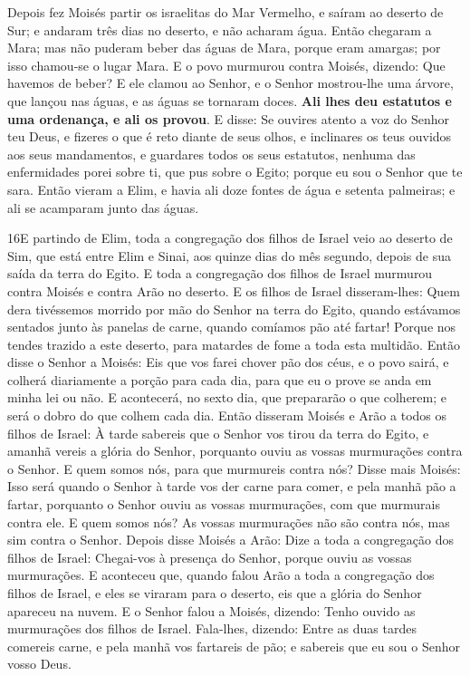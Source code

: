 Depois fez Moisés partir os israelitas do Mar Vermelho, e saíram
ao deserto de Sur; e andaram três dias no deserto, e não acharam
água. Então chegaram a Mara; mas não puderam beber das águas
de Mara, porque eram amargas; por isso chamou-se o lugar Mara.
E o povo murmurou contra Moisés, dizendo: Que havemos de
beber? E ele clamou ao Senhor, e o Senhor mostrou-lhe uma
árvore, que lançou nas águas, e as águas se tornaram doces.
\textbf{Ali lhes deu estatutos e uma ordenança, e ali os provou}.
E disse: Se ouvires atento a voz do Senhor teu Deus, e
fizeres o que é reto diante de seus olhos, e inclinares os teus
ouvidos aos seus mandamentos, e guardares todos os seus estatutos,
nenhuma das enfermidades porei sobre ti, que pus sobre o Egito;
porque eu sou o Senhor que te sara. Então vieram a Elim, e
havia ali doze fontes de água e setenta palmeiras; e ali se
acamparam junto das águas.

\medskip

\lettrine{16} E partindo de Elim, toda a congregação dos
filhos de Israel veio ao deserto de Sim, que está entre Elim e
Sinai, aos quinze dias do mês segundo, depois de sua saída da terra
do Egito. E toda a congregação dos filhos de Israel murmurou
contra Moisés e contra Arão no deserto. E os filhos de Israel
disseram-lhes: Quem dera tivéssemos morrido por mão do Senhor na
terra do Egito, quando estávamos sentados junto às panelas de carne,
quando comíamos pão até fartar! Porque nos tendes trazido a este
deserto, para matardes de fome a toda esta multidão. Então disse
o Senhor a Moisés: Eis que vos farei chover pão dos céus, e o povo
sairá, e colherá diariamente a porção para cada dia, para que eu o
prove se anda em minha lei ou não. E acontecerá, no sexto dia,
que prepararão o que colherem; e será o dobro do que colhem cada
dia. Então disseram Moisés e Arão a todos os filhos de Israel: À
tarde sabereis que o Senhor vos tirou da terra do Egito, e
amanhã vereis a glória do Senhor, porquanto ouviu as vossas
murmurações contra o Senhor. E quem somos nós, para que murmureis
contra nós? Disse mais Moisés: Isso será quando o Senhor à tarde
vos der carne para comer, e pela manhã pão a fartar, porquanto o
Senhor ouviu as vossas murmurações, com que murmurais contra ele. E
quem somos nós? As vossas murmurações não são contra nós, mas sim
contra o Senhor. Depois disse Moisés a Arão: Dize a toda a
congregação dos filhos de Israel: Chegai-vos à presença do Senhor,
porque ouviu as vossas murmurações. E aconteceu que, quando
falou Arão a toda a congregação dos filhos de Israel, e eles se
viraram para o deserto, eis que a glória do Senhor apareceu na
nuvem. E o Senhor falou a Moisés, dizendo: Tenho
ouvido as murmurações dos filhos de Israel. Fala-lhes, dizendo:
Entre as duas tardes comereis carne, e pela manhã vos fartareis de
pão; e sabereis que eu sou o Senhor vosso Deus.

